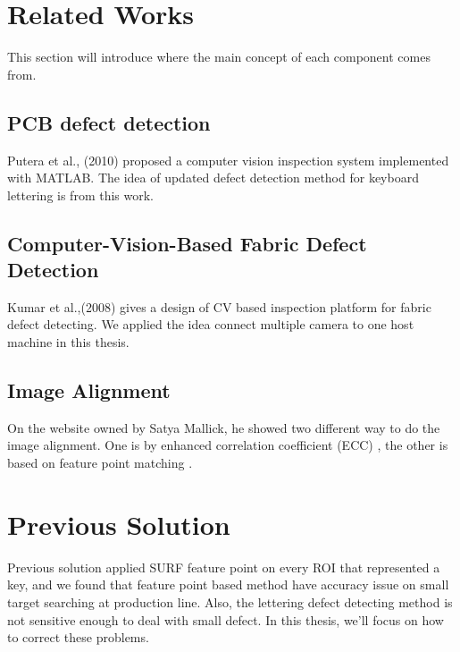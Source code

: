 \section{Related Works} 
    This section will introduce where the main concept of each component comes from.
    \subsection{PCB defect detection}
        Putera et al., \cite{putera2010printed} (2010) proposed a computer vision inspection system implemented with MATLAB.
        The idea of updated defect detection method for keyboard lettering is from this work.

    \subsection{Computer-Vision-Based Fabric Defect Detection}
        Kumar et al.,(2008)\cite{kumar2008computer} gives a design of CV based inspection platform for fabric defect detecting.
        We applied the idea connect multiple camera to one host machine in this thesis.

    \subsection{Image Alignment}
        On the website owned by Satya Mallick, he showed two different way to do the image alignment.
        One is by enhanced correlation coefficient (ECC) \cite{ECC_Alignment}, the other is based on feature point matching \cite{featureBasedAlignment}.

\section{Previous Solution}
    Previous solution applied SURF feature point on every ROI that represented a key, and we found that feature point based method have accuracy issue on small target searching at production line.
    Also, the lettering defect detecting method is not sensitive enough to deal with small defect.
    In this thesis, we'll focus on how to correct these problems.